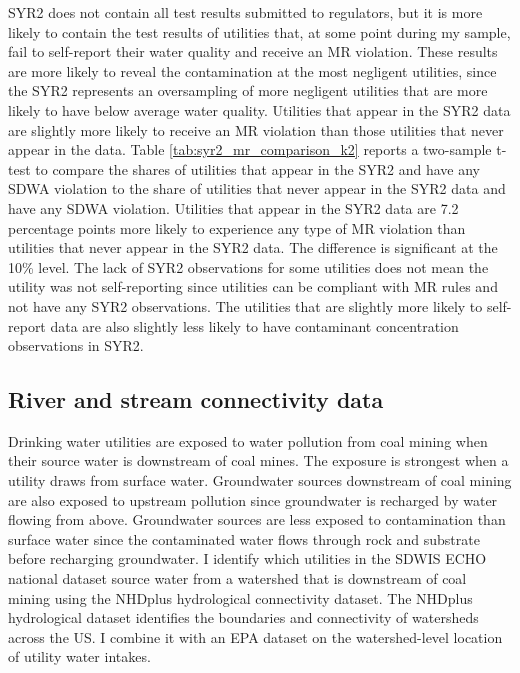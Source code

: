 \documentclass[12pt]{article}
\begin{document}
SYR2 does not contain all test results submitted to regulators, but it is more likely to contain the test results of utilities that, at some point during my sample, fail to self-report their water quality and receive an MR violation. These results are more likely to reveal the contamination at the most negligent utilities, since the SYR2 represents an oversampling of more negligent utilities that are more likely to have below average water quality. Utilities that appear in the SYR2 data are slightly more likely to receive an MR violation than those utilities that never appear in the data. Table \ref{tab:syr2_mr_comparison_k2} reports a two-sample t-test to compare the shares of utilities that appear in the SYR2 and have any SDWA violation to the share of utilities that never appear in the SYR2 data and have any SDWA violation. Utilities that appear in the SYR2 data are 7.2 percentage points more likely to experience any type of MR violation than utilities that never appear in the SYR2 data. The difference is significant at the 10\% level. The lack of SYR2 observations for some utilities does not mean the utility was not self-reporting since utilities can be compliant with MR rules and not have any SYR2 observations. The utilities that are slightly more likely to self-report data are also slightly less likely to have contaminant concentration observations in SYR2.

\subsection{River and stream connectivity data}

Drinking water utilities are exposed to water pollution from coal mining when their source water is downstream of coal mines. The exposure is strongest when a utility draws from surface water. Groundwater sources downstream of coal mining are also exposed to upstream pollution since groundwater is recharged by water flowing from above. Groundwater sources are less exposed to contamination than surface water since the contaminated water flows through rock and substrate before recharging groundwater. I identify which utilities in the SDWIS ECHO national dataset source water from a watershed that is downstream of coal mining using the NHDplus hydrological connectivity dataset. The NHDplus hydrological dataset identifies the boundaries and connectivity of watersheds across the US. I combine it with an EPA dataset on the watershed-level location of utility water intakes. 
\end{document}
